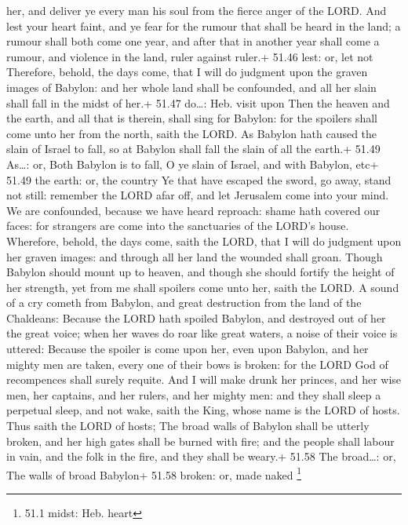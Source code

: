 her, and deliver ye every man his soul from the fierce anger of the
LORD.  And lest your heart faint, and ye fear for the
rumour that shall be heard in the land; a rumour shall both come one
year, and after that in another year shall come a rumour, and violence
in the land, ruler against ruler.+ 51.46 lest: or, let not 
Therefore, behold, the days come, that I will do judgment upon the
graven images of Babylon: and her whole land shall be confounded, and
all her slain shall fall in the midst of her.+ 51.47 do\ldots: Heb.
visit upon  Then the heaven and the earth, and all that is
therein, shall sing for Babylon: for the spoilers shall come unto her
from the north, saith the LORD.  As Babylon hath caused the
slain of Israel to fall, so at Babylon shall fall the slain of all the
earth.+ 51.49 As\ldots: or, Both Babylon is to fall, O ye slain of
Israel, and with Babylon, etc+ 51.49 the earth: or, the country
 Ye that have escaped the sword, go away, stand not still:
remember the LORD afar off, and let Jerusalem come into your mind.
 We are confounded, because we have heard reproach: shame
hath covered our faces: for strangers are come into the sanctuaries of
the LORD's house.  Wherefore, behold, the days come, saith
the LORD, that I will do judgment upon her graven images: and through
all her land the wounded shall groan.  Though Babylon
should mount up to heaven, and though she should fortify the height of
her strength, yet from me shall spoilers come unto her, saith the LORD.
 A sound of a cry cometh from Babylon, and great
destruction from the land of the Chaldeans:  Because the
LORD hath spoiled Babylon, and destroyed out of her the great voice;
when her waves do roar like great waters, a noise of their voice is
uttered:  Because the spoiler is come upon her, even upon
Babylon, and her mighty men are taken, every one of their bows is
broken: for the LORD God of recompences shall surely requite.
 And I will make drunk her princes, and her wise men, her
captains, and her rulers, and her mighty men: and they shall sleep a
perpetual sleep, and not wake, saith the King, whose name is the LORD of
hosts.  Thus saith the LORD of hosts; The broad walls of
Babylon shall be utterly broken, and her high gates shall be burned with
fire; and the people shall labour in vain, and the folk in the fire, and
they shall be weary.+ 51.58 The broad\ldots: or, The walls of broad
Babylon+ 51.58 broken: or, made naked \footnote{51.1 midst: Heb. heart}

